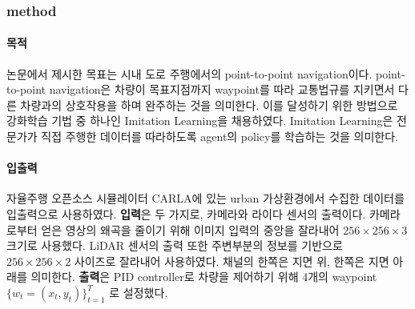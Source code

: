 \subsubsection{method}{\label{subsubsec:tf_method}}
\paragraph*{목적} 논문에서 제시한 목표는 시내 도로 주행에서의 point-to-point navigation이다.
point-to-point navigation은 차량이 목표지점까지
waypoint를 따라
교통법규를 지키면서
다른 차량과의 상호작용을 하며
완주하는 것을 의미한다.
이를 달성하기 위한 방법으로 강화학습 기법 중 하나인 Imitation Learning을 채용하였다.
Imitation Learning은 전문가가 직접 주행한 데이터를 따라하도록 agent의 policy를 학습하는 것을 의미한다.

\paragraph*{입출력} 자율주행 오픈소스 시뮬레이터 CARLA\cite{CARLA}에 있는 urban 가상환경에서 수집한 데이터를 입출력으로 사용하였다.
\textbf{입력}은 두 가지로, 카메라와 라이다 센서의 출력이다.
카메라로부터 얻은 영상의 왜곡을 줄이기 위해 이미지 입력의 중앙을 잘라내어 $256 \times 256 \times 3$  크기로 사용했다.
LiDAR 센서의 출력 또한 주변부분의 정보를 기반으로 $256 \times 256 \times 2$ 사이즈로 잘라내어 사용하였다.
채널의 한쪽은 지면 위, 한쪽은 지면 아래를 의미한다.
\textbf{출력}은 PID controller로 차량을 제어하기 위해 4개의 waypoint $\{w_t = (x_t, y_t)\}_{t=1}^T$ 로 설정했다.

